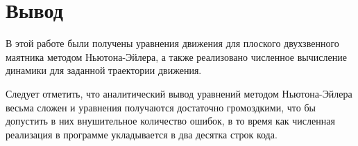 \documentclass[a4paper,14pt]{extreport}
\begin{document}
\section{Вывод}

В этой работе были получены уравнения движения для плоского двухзвенного маятника методом Ньютона-Эйлера, а также реализовано численное вычисление динамики для заданной траектории движения.

Следует отметить, что аналитический вывод уравнений методом Ньютона-Эйлера весьма сложен и уравнения получаются достаточно громоздкими, что бы допустить в них внушительное количество ошибок, в то время как численная реализация в программе укладывается в два десятка строк кода.
\end{document}
